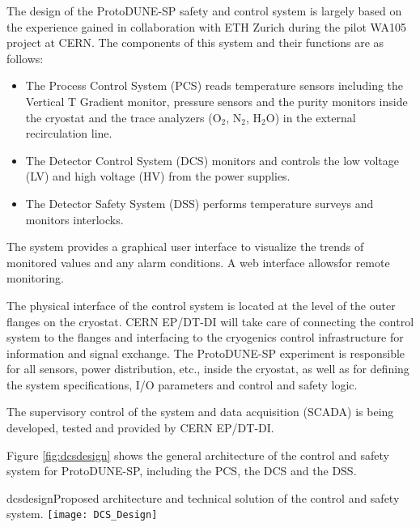 The design of the ProtoDUNE-SP safety and control system is largely based on the experience gained in collaboration with ETH Zurich during the pilot WA105 project at CERN. The components of this system and their functions are as follows:
\begin{itemize}
\item	The Process Control System (PCS) reads temperature sensors including the Vertical T Gradient monitor, pressure sensors and the purity monitors inside the cryostat and the trace analyzers (O$_2$, N$_2$, H$_2$O) in the external recirculation line.
\item	The Detector Control System (DCS) monitors and controls the low voltage (LV) and high voltage (HV) from the power supplies.
\item	The Detector Safety System (DSS) %
performs temperature surveys and monitors interlocks.
\end{itemize}
The system provides a graphical user interface to visualize the trends of monitored values and any alarm conditions.
 A web interface allowsfor remote monitoring. 

The physical interface of the control system is located at the level of the outer flanges on the cryostat. 
 CERN EP/DT-DI will take care of connecting the control system to the flanges and interfacing to the cryogenics control infrastructure for information and signal exchange. 
The ProtoDUNE-SP experiment is responsible for all sensors, power distribution, etc., inside the cryostat, %
as well as for defining the system specifications, I/O parameters and control and safety logic. 
 
The supervisory control of the system and data acquisition (SCADA) is being developed, tested and provided by CERN EP/DT-DI.	%


Figure \ref{fig:dcsdesign} shows the general architecture of the control and safety system for ProtoDUNE-SP, including the PCS, the DCS and the DSS.

\begin{cdrfigure}{dcsdesign}{Proposed architecture and technical solution of the control and safety system.}
\texttt{[image: DCS\_Design]}
\end{cdrfigure}

